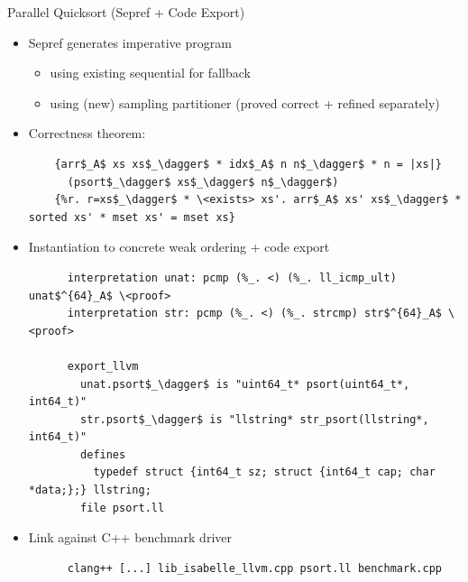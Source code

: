 \documentclass[fleqn]{beamer}
\begin{document}
\begin{frame}[t,fragile]{Parallel Quicksort (Sepref + Code Export)}
  \small

  \begin{itemize}
   \item<1-> Sepref generates imperative program
    \begin{itemize}
     \item using existing sequential  for fallback
     \item using (new) sampling partitioner (proved correct + refined separately)

    \end{itemize}
   \item<2-> Correctness theorem:
    {
    \begin{lstlisting}
    {arr$_A$ xs xs$_\dagger$ * idx$_A$ n n$_\dagger$ * n = |xs|}
      (psort$_\dagger$ xs$_\dagger$ n$_\dagger$)
    {%r. r=xs$_\dagger$ * \<exists> xs'. arr$_A$ xs' xs$_\dagger$ * sorted xs' * mset xs' = mset xs}
    \end{lstlisting}}
   \item<3-> Instantiation to concrete weak ordering + code export
    {
    \begin{lstlisting}
      interpretation unat: pcmp (%_. <) (%_. ll_icmp_ult) unat$^{64}_A$ \<proof>
      interpretation str: pcmp (%_. <) (%_. strcmp) str$^{64}_A$ \<proof>

      export_llvm
        unat.psort$_\dagger$ is "uint64_t* psort(uint64_t*, int64_t)"
        str.psort$_\dagger$ is "llstring* str_psort(llstring*, int64_t)"
        defines
          typedef struct {int64_t sz; struct {int64_t cap; char *data;};} llstring;
        file psort.ll
    \end{lstlisting}}

   \item<4-> Link against C++ benchmark driver
    \begin{lstlisting}
      clang++ [...] lib_isabelle_llvm.cpp psort.ll benchmark.cpp
    \end{lstlisting}

  \end{itemize}
\end{frame}
\end{document}
